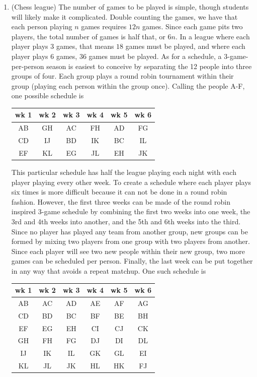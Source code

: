 {\begin{enumerate}
		\item (Chess league) The number of games to be played is simple, though students will likely make it complicated. Double counting the games, we have that each person playing $n$ games requires $12n$ games. Since each game pits two players, the total number of games is half that, or $6n$. In a league where each player plays 3 games, that means $18$ games must be played, and where each player plays 6 games, $36$ games must be played. As for a schedule, a 3-game-per-person season is easiest to conceive by separating the 12 people into three groups of four. Each group plays a round robin tournament within their group (playing each person within the group once). Calling the people A-F, one possible schedule is
		\begin{center}
			\begin{tabular}{|c|c|c|c|c|c|}
				\hline
				wk 1 & wk 2 & wk 3 & wk 4 & wk 5 & wk 6\\
				\hline
				AB & GH & AC & FH & AD & FG\\
				\hline
				CD & IJ & BD & IK & BC & IL\\
				\hline
				EF & KL & EG & JL & EH & JK\\
				\hline
			\end{tabular}
		\end{center}
		This particular schedule has half the league playing each night with each player playing every other week. To create a schedule where each player plays six times is more difficult because it can not be done in a round robin fashion. However, the first three weeks can be made of the round robin inspired 3-game schedule by combining the first two weeks into one week, the 3rd and 4th weeks into another, and the 5th and 6th weeks into the third. Since no player has played any team from another group, new groups can be formed by mixing two players from one group with two players from another. Since each player will see two new people within their new group, two more games can be scheduled per person. Finally, the last week can be put together in any way that avoids a repeat matchup. One such schedule is
		\begin{center}
			\begin{tabular}{|c|c|c|c|c|c|}
				\hline
				wk 1 & wk 2 & wk 3 & wk 4 & wk 5 & wk 6\\
				\hline
				AB & AC & AD & AE & AF & AG\\
				\hline
				CD & BD & BC & BF & BE & BH\\
				\hline
				EF & EG & EH & CI & CJ & CK\\
				\hline
				GH & FH & FG & DJ & DI & DL\\
				\hline
				IJ & IK & IL & GK & GL & EI\\
				\hline
				KL & JL & JK & HL & HK & FJ\\
				\hline
			\end{tabular}
		\end{center}
	\end{enumerate}
}

